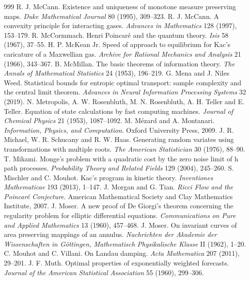 \begin{thebibliography}{999}
 R. J. McCann. Existence and uniqueness of monotone measure preserving maps. \emph{Duke Mathematical Journal} 80 (1995), 309--323.
 R. J. McCann. A convexity principle for interacting gases. \emph{Advances in Mathematics} 128 (1997), 153--179.
 R. McCormmach. Henri Poincar\'e and the quantum theory. \emph{Isis} 58 (1967), 37--55.
 H. P. McKean Jr. Speed of approach to equilibrium for Kac's caricature of a Maxwellian gas. \emph{Archive for Rational Mechanics and Analysis} 21 (1966), 343--367.
 B. McMillan. The basic theorems of information theory. \emph{The Annals of Mathematical Statistics} 24 (1953), 196--219.
 G. Mena and J. Niles Weed. Statistical bounds for entropic optimal transport: sample complexity and the central limit theorem. \emph{Advances in Neural Information Processing Systems} 32 (2019).
 N. Metropolis, A. W. Rosenbluth, M. N. Rosenbluth, A. H. Teller and E. Teller. Equation of state calculations by fast computing machines. \emph{Journal of Chemical Physics} 21 (1953), 1087--1092.
 M. M\'ezard and A. Montanari. \emph{Information, Physics, and Computation}. Oxford University Press, 2009.
 J. R. Michael, W. R. Schucany and R. W. Haas. Generating random variates using transformations with multiple roots. \emph{The American Statistician} 30 (1976), 88--90.
 T. Mikami. Monge's problem with a quadratic cost by the zero noise limit of h path processes. \emph{Probability Theory and Related Fields} 129 (2004), 245--260.
 S. Mischler and C. Mouhot. Kac's program in kinetic theory. \emph{Inventiones Mathematicae} 193 (2013), 1--147.
 J. Morgan and G. Tian. \emph{Ricci Flow and the Poincar\'e Conjecture}. American Mathematical Society and Clay Mathematics Institute, 2007.
 J. Moser. A new proof of De Giorgi's theorem concerning the regularity problem for elliptic differential equations. \emph{Communications on Pure and Applied Mathematics} 13 (1960), 457--468.
 J. Moser. On invariant curves of area preserving mappings of an annulus. \emph{Nachrichten der Akademie der Wissenschaften in G\"ottingen, Mathematisch Physikalische Klasse} II (1962), 1--20.
 C. Mouhot and C. Villani. On Landau damping. \emph{Acta Mathematica} 207 (2011), 29--201.
 J. F. Muth. Optimal properties of exponentially weighted forecasts. \emph{Journal of the American Statistical Association} 55 (1960), 299--306.

\end{thebibliography}
